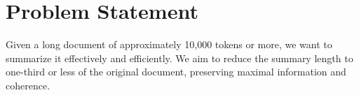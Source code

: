 \section{Problem Statement}
\label{sec:problem}

Given a long document of approximately 10,000 tokens or more, we want to summarize it
effectively and efficiently.
We aim to reduce the summary length to one-third or less of the original document,
preserving maximal information and coherence.

